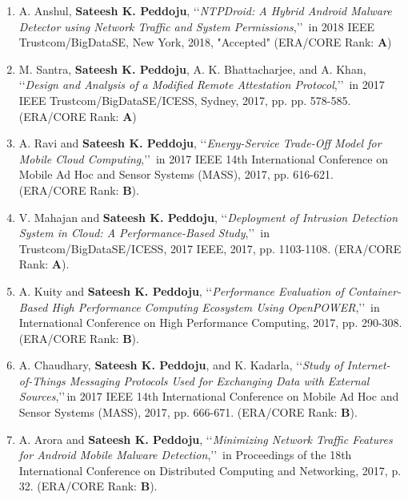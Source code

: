 \begin{enumerate}[label=(C\arabic*).]	

	\item
	A. Anshul, \textbf{Sateesh K. Peddoju}, \lq\lq \textit{NTPDroid: A Hybrid Android Malware Detector using Network Traffic and System Permissions},\rq\rq\, in 2018 IEEE Trustcom/BigDataSE, New York, 2018, "Accepted" (ERA/CORE Rank: \textbf{A})
	
	\item
	M. Santra, \textbf{Sateesh K. Peddoju}, A. K. Bhattacharjee, and A. Khan, \lq\lq \textit{Design and Analysis of a Modified Remote Attestation Protocol},\rq\rq\, in 2017 IEEE Trustcom/BigDataSE/ICESS, Sydney, 2017, pp. pp. 578-585. (ERA/CORE Rank: \textbf{A})
	
	\item
	A. Ravi and \textbf{Sateesh K. Peddoju}, \lq\lq \textit{Energy-Service Trade-Off Model for Mobile Cloud Computing},\rq\rq\, in 2017 IEEE 14th International Conference on Mobile Ad Hoc and Sensor Systems (MASS), 2017, pp. 616-621. (ERA/CORE Rank: \textbf{B}).
	
	\item
	V. Mahajan and \textbf{Sateesh K. Peddoju}, \lq\lq \textit{Deployment of Intrusion Detection System in Cloud: A Performance-Based Study},\rq\rq\,  in Trustcom/BigDataSE/ICESS, 2017 IEEE, 2017, pp. 1103-1108. (ERA/CORE Rank: \textbf{A}).
	
	\item
	A. Kuity and \textbf{Sateesh K. Peddoju}, \lq\lq \textit{Performance Evaluation of Container-Based High Performance Computing Ecosystem Using OpenPOWER},\rq\rq\,  in International Conference on High Performance Computing, 2017, pp. 290-308. (ERA/CORE Rank: \textbf{B}).
	
	\item
	A. Chaudhary, \textbf{Sateesh K. Peddoju}, and K. Kadarla, \lq\lq \textit{Study of Internet-of-Things Messaging Protocols Used for Exchanging Data with External Sources},\rq\rq\,in 2017 IEEE 14th International Conference on Mobile Ad Hoc and Sensor Systems (MASS), 2017, pp. 666-671. (ERA/CORE Rank: \textbf{B}).
	
	\item
	A. Arora and \textbf{Sateesh K. Peddoju}, \lq\lq \textit{Minimizing Network Traffic Features for Android Mobile Malware Detection},\rq\rq\, in Proceedings of the 18th International Conference on Distributed Computing and Networking, 2017, p. 32. (ERA/CORE Rank: \textbf{B}).
	

\end{enumerate}
